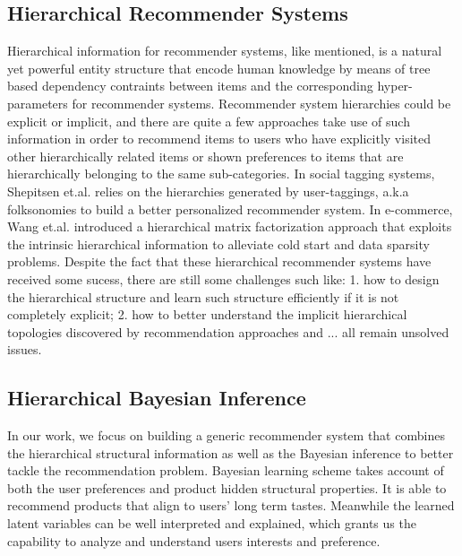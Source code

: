 \subsection{Hierarchical Recommender Systems}
Hierarchical information for recommender systems, like mentioned, is a natural yet powerful entity structure that encode human knowledge by means of tree based dependency contraints between items and the corresponding hyper-parameters for recommender systems.  Recommender system hierarchies could be explicit or implicit, and there are quite a few approaches take use of such information in order to recommend items to users who have explicitly visited other hierarchically related items or shown preferences to items that are hierarchically belonging to the same sub-categories.  In social tagging systems, Shepitsen et.al. \cite{shepitsen2008personalized} relies on the hierarchies generated by user-taggings, a.k.a folksonomies to build a better personalized recommender system.  In e-commerce, Wang et.al. \cite{wang2018exploring} introduced a hierarchical matrix factorization approach that exploits the intrinsic hierarchical information to alleviate cold start and data sparsity problems.  Despite the fact that these hierarchical recommender systems have received some sucess, there are still some challenges such like: 1. how to design the hierarchical structure and learn such structure efficiently if it is not completely explicit; 2. how to better understand the implicit hierarchical topologies discovered by recommendation approaches and ... all remain unsolved issues.

\subsection{Hierarchical Bayesian Inference}
In our work, we focus on building a generic recommender system that combines the hierarchical structural information as well as the Bayesian inference to better tackle the recommendation problem.  Bayesian learning scheme takes account of both the user preferences and product hidden structural properties. It is able to recommend products that align to users' long term tastes. Meanwhile the learned latent variables can be well interpreted and explained, which grants us the capability to analyze and understand users interests and preference.
